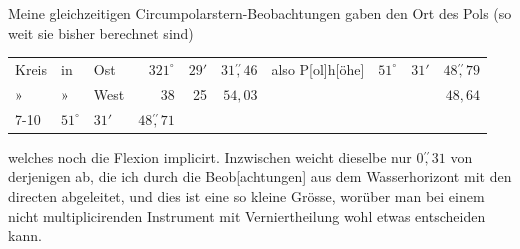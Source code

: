 \noindent\hspace*{\parindent}Meine gleichzeitigen Circumpolarstern-Beobachtungen gaben den Ort des Pols (so weit sie bisher berechnet sind)
\begin{center}\begingroup\fontsize{10}{12}\selectfont\setlength{\tabcolsep}{2pt}
\begin{tabular}{@{}lllrrrlrrr@{}}
Kreis&in&Ost&\(321^\circ\)&\(29'\)&\(31\overset{\prime\prime}{,}46\)&also P[ol]h[öhe]&\(51^\circ\)&\(31'\)&\(48\overset{\prime\prime}{,}79\)\\
»&»&West&38&25&\(54{,}03\)&&&&\(48{,}64\)\\\cline{7-10}
\multicolumn{7}{r}{Mittel}&\(51^\circ\)&\(31'\)&\(48\overset{\prime\prime}{,}71\)
\end{tabular}\par\endgroup\end{center}
\noindent welches noch die Flexion implicirt. Inzwischen weicht dieselbe nur \(0\overset{\prime\prime}{,}31\) von derjenigen ab, die ich durch die Beob[achtungen] aus dem Wasserhorizont mit den directen abgeleitet, und dies ist eine so kleine Grösse, worüber man bei einem nicht multiplicirenden Instrument mit Verniertheilung wohl  etwas entscheiden kann.
\clearpage\endgroup
